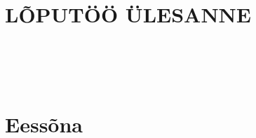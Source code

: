 
\setcounter{page}{\abstractPageNumber} %
\fontsize{12}{0} %

\chapter*{{\authorDeclarationTitle}}\label{chapter:declaration} %
\pagebreak %

\chapter*{LÕPUTÖÖ ÜLESANNE}\label{chapter:assignment}

\pagebreak

\chapter*{{\abstactTitle}}\label{chapter:abstract}
    {}
    {}
\pagebreak

\chapter*{
    {\secondAbstractTitle}\\[24pt] %
    {\large\abstractThesisTitle}
}\label{chapter:abstract-english}
    {}
    {}
\pagebreak

\chapter*{Eessõna}\label{chapter:foreword}

\pagebreak

